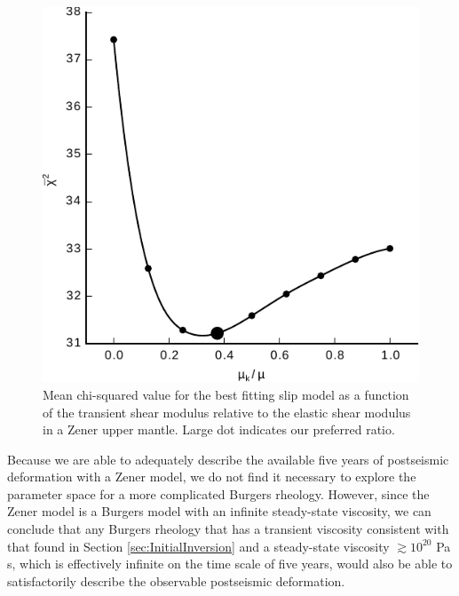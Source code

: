 \documentclass[draft,linenumbers]{AGUJournal}
\begin{document}
\begin{figure}
\includegraphics[scale=0.9]{Figures/RatioMisfit}
\centering 
\caption{Mean chi-squared value for the best fitting slip model as a function of the transient shear modulus relative to the elastic shear modulus in a Zener upper mantle. Large dot indicates our preferred ratio.}
\label{fig:ShearModulusRatio}
\end{figure}

Because we are able to adequately describe the available five years of postseismic deformation with a Zener model, we do not find it necessary to explore the parameter space for a more complicated Burgers rheology.  However, since the Zener model is a Burgers model with an infinite steady-state viscosity, we can conclude that any Burgers rheology that has a transient viscosity consistent with that found in Section \ref{sec:InitialInversion} and a steady-state viscosity $\gtrsim10^{20}$ Pa s, which is effectively infinite on the time scale of five years, would also be able to satisfactorily describe the observable postseismic deformation.        
  
\end{document}
